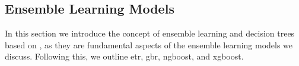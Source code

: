 \subsection{Ensemble Learning Models}
In this section we introduce the concept of ensemble learning and decision trees based on \citet{James2023AnIS}, as they are fundamental aspects of the ensemble learning models we discuss.
Following this, we outline \gls{etr}, \gls{gbr}, \gls{ngboost}, and \gls{xgboost}.






